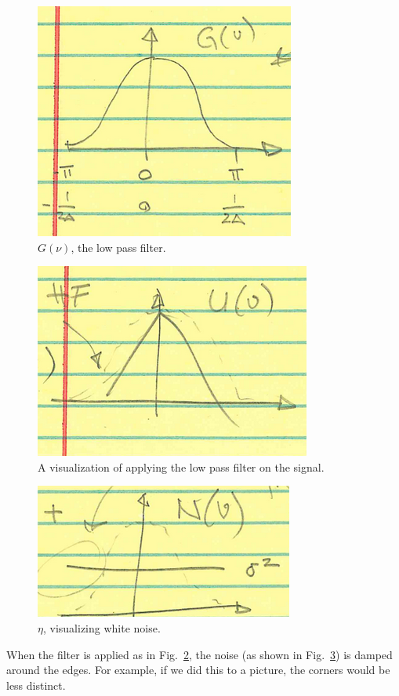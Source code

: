 \documentclass[11pt]{article}
\newcommand{\figref}[1]{Fig.~\ref{#1}}
\begin{document}
\begin{figure}
    \centering
    \includegraphics[scale=0.8]{figures/lecture04/Low_pass_filter.png}
    \caption{$G(\nu)$, the low pass filter.}
    \label{fig:Low Pass}
\end{figure}
\begin{figure}
    \centering
    \includegraphics[scale=0.8]{figures/lecture04/U_from_filter.png}
    \caption{A visualization of applying the low pass filter on the signal.}
    \label{fig:Signal}
\end{figure}
\begin{figure}
    \centering
    \includegraphics[scale=0.8]{figures/lecture04/White_noise.png}
    \caption{$\eta$, visualizing white noise.}
    \label{fig:White Noise}
\end{figure}
When the filter is applied as in \figref{fig:Signal}, the noise (as shown in \figref{fig:White Noise}) is damped around the edges.
For example, if we did this to a picture, the corners would be less distinct.
\end{document}
